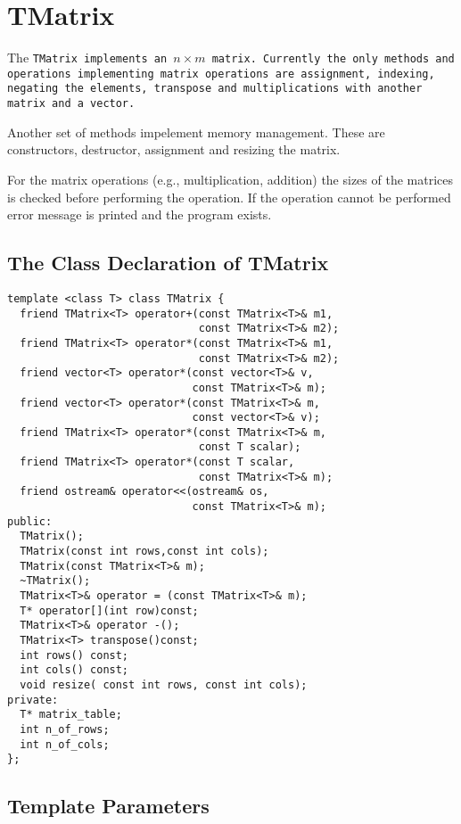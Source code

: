 \section{TMatrix}

The \tt TMatrix \rm implements an $n \times m$ matrix. Currently
the only methods and operations implementing matrix operations 
are assignment, indexing, negating the elements, transpose and 
multiplications with another matrix and a vector.

Another set of methods impelement memory management. These
are constructors, destructor, assignment  and resizing the matrix.

For the matrix operations (e.g., multiplication, addition)
 the sizes of the matrices is checked
before performing the operation. 
If the operation cannot be performed
error message is printed and the program exists.

\subsection{The Class Declaration of TMatrix}
\begin{verbatim}
template <class T> class TMatrix {
  friend TMatrix<T> operator+(const TMatrix<T>& m1,
                              const TMatrix<T>& m2);
  friend TMatrix<T> operator*(const TMatrix<T>& m1,
                              const TMatrix<T>& m2);
  friend vector<T> operator*(const vector<T>& v, 
                             const TMatrix<T>& m);
  friend vector<T> operator*(const TMatrix<T>& m, 
                             const vector<T>& v);
  friend TMatrix<T> operator*(const TMatrix<T>& m,
                              const T scalar);
  friend TMatrix<T> operator*(const T scalar,
                              const TMatrix<T>& m);
  friend ostream& operator<<(ostream& os, 
                             const TMatrix<T>& m);
public:
  TMatrix();    
  TMatrix(const int rows,const int cols);
  TMatrix(const TMatrix<T>& m);
  ~TMatrix();
  TMatrix<T>& operator = (const TMatrix<T>& m);
  T* operator[](int row)const;
  TMatrix<T>& operator -();
  TMatrix<T> transpose()const;
  int rows() const;
  int cols() const;
  void resize( const int rows, const int cols);  
private:
  T* matrix_table;
  int n_of_rows;
  int n_of_cols;
};

\end{verbatim}

\subsection{Template Parameters}


